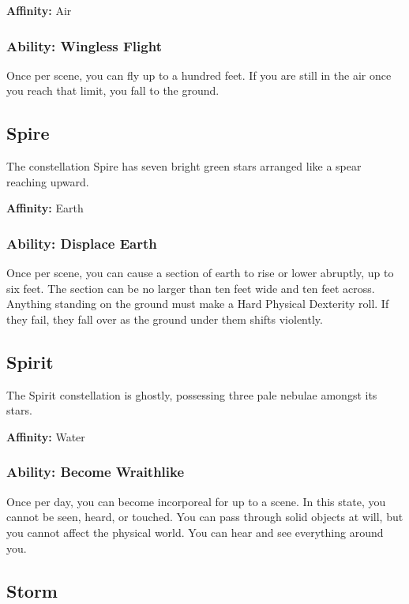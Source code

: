 \begin{multicols}{2}
\textbf{Affinity:} Air

\subsubsection{Ability: Wingless Flight}

Once per scene, you can fly up to a hundred feet. If you are
still in the air once you reach that limit, you fall to the ground.

\subsection{Spire}

The constellation Spire has seven bright green stars arranged
like a spear reaching upward.

\textbf{Affinity:} Earth

\subsubsection{Ability: Displace Earth}

Once per scene, you can cause a section of earth to rise or lower
abruptly, up to six feet. The section can be no larger than ten
feet wide and ten feet across. Anything standing on the ground
must make a Hard Physical Dexterity roll. If they fail, they fall
over as the ground under them shifts violently.

\subsection{Spirit}

The Spirit constellation is ghostly, possessing three pale nebulae amongst
its stars.

\textbf{Affinity:} Water

\subsubsection{Ability: Become Wraithlike}

Once per day, you can become incorporeal for up to a scene. In this state,
you cannot be seen, heard, or touched. You can pass through solid objects
at will, but you cannot affect the physical world. You can hear and see
everything around you.

\subsection{Storm}


\end{multicols}
